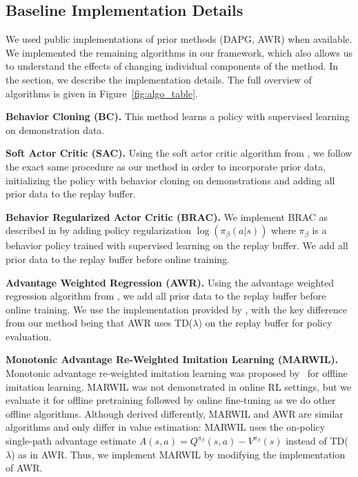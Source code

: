 \documentclass[conference]{IEEEtran}
\begin{document}
\subsection{Baseline Implementation Details} \label{sec:baseline_impl}

We used public implementations of prior methods (DAPG, AWR) when available. We implemented the remaining algorithms in our framework, which also allows us to understand the effects of changing individual components of the method. In the section, we describe the implementation details. The full overview of algorithms is given in Figure~\ref{fig:algo_table}.

\textbf{Behavior Cloning (BC).}  This method learns a policy with supervised learning on demonstration data.

\textbf{Soft Actor Critic (SAC).} Using the soft actor critic algorithm from \citep{haarnoja2018sac}, we follow the exact same procedure as our method in order to incorporate prior data, initializing the policy with behavior cloning on demonstrations and adding all prior data to the replay buffer. 

\textbf{Behavior Regularized Actor Critic (BRAC).} We implement BRAC as described in \citep{wu2019brac} by adding policy regularization $\log(\pi_\beta(a|s))$ where $\pi_\beta$ is a behavior policy trained with supervised learning on the replay buffer. We add all prior data to the replay buffer before online training. 

\textbf{Advantage Weighted Regression (AWR).} Using the advantage weighted regression algorithm from \citep{peng2019awr}, we add all prior data to the replay buffer before online training. We use the implementation provided by \citet{peng2019awr}, with the key difference from our method being that AWR uses TD($\lambda$) on the replay buffer for policy evaluation.

\textbf{Monotonic Advantage Re-Weighted Imitation Learning (MARWIL).} Monotonic advantage re-weighted imitation learning was proposed by~\citet{wang2018marwil} for offline imitation learning. MARWIL was not demonstrated in online RL settings, but we evaluate it for offline pretraining followed by online fine-tuning as we do other offline algorithms. Although derived differently, MARWIL and AWR are similar algorithms and only differ in value estimation: MARWIL uses the on-policy single-path advantage estimate $A(s, a) = Q^{\pi_\beta}(s, a) - V^{\pi_\beta}(s)$ instead of TD($\lambda$) as in AWR. Thus, we implement MARWIL by modifying the implementation of AWR.
\end{document}

